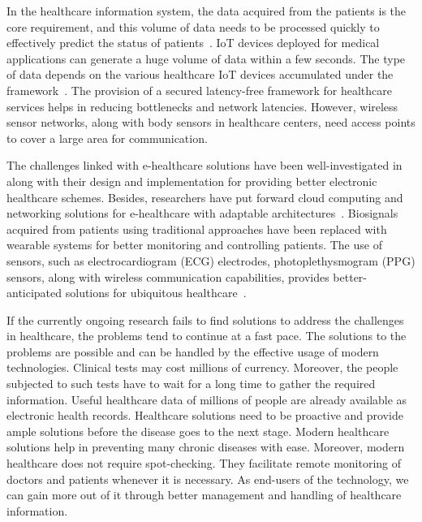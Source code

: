 \documentclass[journal]{IEEEtran}
\begin{document}
In the healthcare information system, the data acquired from the patients is the core requirement, and this volume of data needs to be processed quickly to effectively predict the status of patients~\cite{elhoseny_secure_2018}. IoT devices deployed for medical applications can generate a huge volume of data within a few seconds. The type of data depends on the various healthcare IoT devices accumulated under the framework~\cite{fadhil_hospital_2012}. The provision of a secured latency-free framework for healthcare services helps in reducing bottlenecks and network latencies. However, wireless sensor networks, along with body sensors in healthcare centers, need access points to cover a large area for communication. 


The challenges linked with e-healthcare solutions have been well-investigated in~\cite{brito_trends_2016} along with their design and implementation for providing better electronic healthcare schemes. Besides, researchers have put forward cloud computing and networking solutions for e-healthcare with adaptable architectures~\cite{caldeira_intra-mobility_2013}. Biosignals acquired from patients using traditional approaches have been replaced with wearable systems for better monitoring and controlling patients. The use of sensors, such as electrocardiogram (ECG) electrodes, photoplethysmogram (PPG) sensors, along with wireless communication capabilities, provides better-anticipated solutions for ubiquitous healthcare~\cite{chen_data-driven_2018}.

If the currently ongoing research fails to find solutions to address the challenges in healthcare, the problems tend to continue at a fast pace. The solutions to the problems are possible and can be handled by the effective usage of modern technologies. Clinical tests may cost millions of currency. Moreover, the people subjected to such tests have to wait for a long time to gather the required information. Useful healthcare data of millions of people are already available as electronic health records. Healthcare solutions need to be proactive and provide ample solutions before the disease goes to the next stage. Modern healthcare solutions help in preventing many chronic diseases with ease. Moreover, modern healthcare does not require spot-checking. They facilitate remote monitoring of doctors and patients whenever it is necessary. As end-users of the technology, we can gain more out of it through better management and handling of healthcare information.
\end{document}
